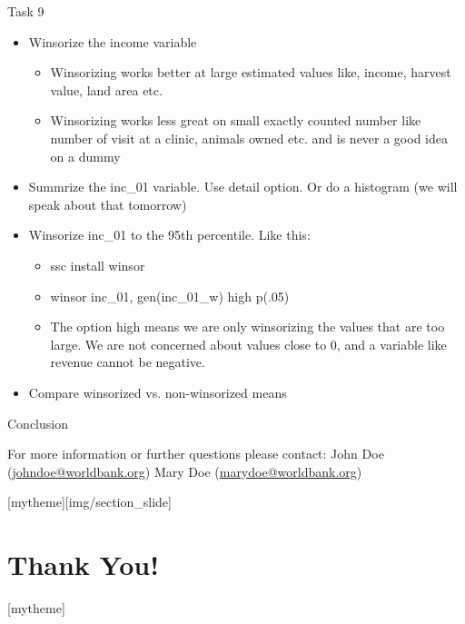 \documentclass[aspectratio=169]{beamer}
\newcommand{\sectionpic}[2]{
	\setbeamertemplate{section page}[mytheme][#2]
	\section{#1}
	\setbeamertemplate{section page}[mytheme]
}
\begin{document}
\begin{frame}{Task 9}
\begin{itemize}
	\item Winsorize the income variable
		\begin{itemize}
			\item 	Winsorizing works better at large estimated values like, income, harvest value, land area etc.
			\item 	Winsorizing works less great on small exactly counted number like number of visit at a clinic, animals owned etc. and is never a good idea on a dummy
		\end{itemize}
	\item Summrize the inc\_01 variable. Use detail option. Or do a histogram (we will speak about that tomorrow)
	\item Winsorize inc\_01 to the 95th percentile. Like this:
		\begin{itemize}
			\item 	ssc install winsor
			\item winsor inc\_01, gen(inc\_01\_w) high p(.05)
			\item The option high means we are only winsorizing the values that are too large. We are not concerned about values close to 0, and a variable like revenue cannot be negative.
		\end{itemize}
	\item Compare winsorized vs. non-winsorized means
\end{itemize}
\end{frame}
	
\begin{frame}{Conclusion}


\vspace{20mm}
For more information or further questions please contact:
\newline John Doe (\url{johndoe@worldbank.org}) \newline Mary Doe (\url{marydoe@worldbank.org})

\end{frame}

\sectionpic{Thank You!}{img/section_slide}
\end{document}
